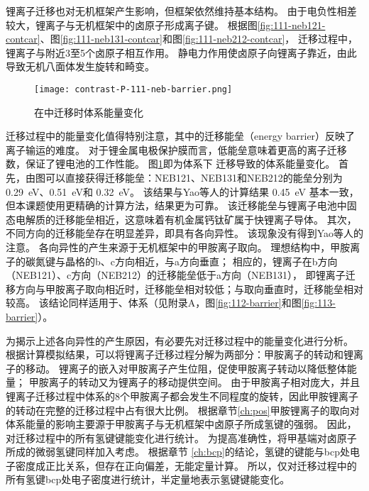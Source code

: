 锂离子迁移也对无机框架产生影响，但框架依然维持基本结构。
由于电负性相差较大，锂离子与无机框架中的卤原子形成离子键。
根据图\ref{fig:111-neb121-contcar}、图\ref{fig:111-neb131-contcar}和图\ref{fig:111-neb212-contcar}，
迁移过程中，锂离子与附近3至5个卤原子相互作用。
静电力作用使卤原子向锂离子靠近，由此导致无机八面体发生旋转和畸变。

\begin{figure}[htbp]
    \centering
    \texttt{[image: contrast-P-111-neb-barrier.png]}
    \caption{在中迁移时体系能量变化}
    \label{fig:111-barrier}
\end{figure}

迁移过程中的能量变化值得特别注意，其中的迁移能垒（energy barrier）反映了离子输运的难度。
对于锂金属电极保护膜而言，低能垒意味着更高的离子迁移数，保证了锂电池的工作性能。
图\ref{fig:111-barrier}即为体系下 迁移导致的体系能量变化。
首先，由图可以直接获得迁移能垒：NEB121、NEB131和NEB212的能垒分别为 \SI{0.29}{eV}、\SI{0.51}{eV}和 \SI{0.32}{eV}。
该结果与Yao等人的计算结果 \SI{0.45}{eV} 基本一致，但本课题使用更精确的计算方法，结果更为可靠。
该迁移能垒与锂离子电池中固态电解质的迁移能垒相近，这意味着有机金属钙钛矿属于快锂离子导体。
其次，不同方向的迁移能垒存在明显差异，即具有各向异性。
该现象没有得到Yao等人的注意。
各向异性的产生来源于无机框架中的甲胺离子取向。
理想结构中，甲胺离子的碳氮键与晶格的b、c方向相近，与a方向垂直；
相应的，锂离子在b方向（NEB121）、c方向（NEB212）的迁移能垒低于a方向（NEB131），
即锂离子迁移方向与甲胺离子取向相近时，迁移能垒相对较低；与取向垂直时，迁移能垒相对较高。
该结论同样适用于、体系（见附录A，图\ref{fig:112-barrier}和图\ref{fig:113-barrier}）。

为揭示上述各向异性的产生原因，有必要先对迁移过程中的能量变化进行分析。
根据计算模拟结果，可以将锂离子迁移过程分解为两部分：甲胺离子的转动和锂离子的移动。
锂离子的嵌入对甲胺离子产生位阻，促使甲胺离子转动以降低整体能量；
甲胺离子的转动又为锂离子的移动提供空间。
由于甲胺离子相对庞大，并且锂离子迁移过程中体系的8个甲胺离子都会发生不同程度的旋转，因此甲胺锂离子的转动在完整的迁移过程中占有很大比例。
根据章节\ref{ch:pos}甲胺锂离子的取向对体系能量的影响主要源于甲胺离子与无机框架中卤原子所成氢键的强弱。
因此，对迁移过程中的所有氢键键能变化进行统计。
为提高准确性，将甲基端对卤原子所成的微弱氢键同样加入考虑。
根据章节 \ref{ch:bcp}的结论，氢键的键能与bcp处电子密度成正比关系，但存在正向偏差，无能定量计算。
所以，仅对迁移过程中的所有氢键bcp处电子密度进行统计，半定量地表示氢键键能变化。

